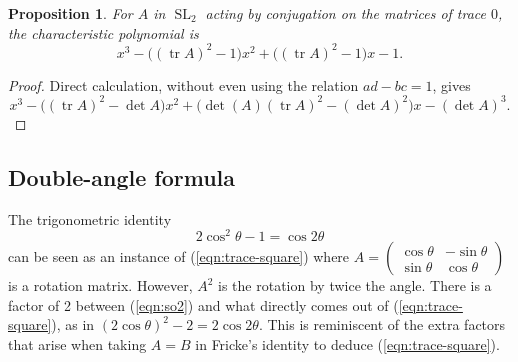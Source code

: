 \documentclass[11pt]{amsart}
\newtheorem{proposition}[theorem]{Proposition}
\theoremstyle{definition}
\numberwithin{figure}{section}
\numberwithin{equation}{section}
\numberwithin{table}{section}
\newcommand{\SL}{\operatorname{SL}}
\newcommand{\tr}{\operatorname{tr}}
\begin{document}
\begin{proposition}
For $A$ in $\SL_2$ acting by conjugation on the matrices of trace $0$, the characteristic polynomial is
\[
x^3 - \big( (\tr{A})^2-1 \big)x^2 +\big( (\tr{A})^2-1 \big) x - 1
.
\]
\end{proposition}
\begin{proof}
Direct calculation, without even using the relation $ad-bc=1$, gives
\[
x^3 - \big( (\tr{A})^2-\det{A}\big)x^2 + \big( \det(A) (\tr{A})^2 - (\det{A})^2 \big)x - (\det{A})^3.
\]
\end{proof}

\subsection{Double-angle formula}

The trigonometric identity
\begin{equation} \label{eqn:so2}
2\cos^2{\theta} - 1 = \cos{2\theta}
\end{equation}
can be seen as an instance of (\ref{eqn:trace-square})
where $A = \begin{pmatrix} \cos{\theta} & -\sin{\theta} \\ \sin{\theta} & \cos{\theta} \end{pmatrix}$ is a rotation matrix. 
However, $A^2$ is the rotation by twice the angle. There is a factor of 2 between (\ref{eqn:so2}) and what directly comes out of (\ref{eqn:trace-square}), as in $(2\cos{\theta})^2-2 =2\cos{2\theta}$.
This is reminiscent of the extra factors that arise when taking $A=B$ in Fricke's identity to deduce (\ref{eqn:trace-square}).
\end{document}
